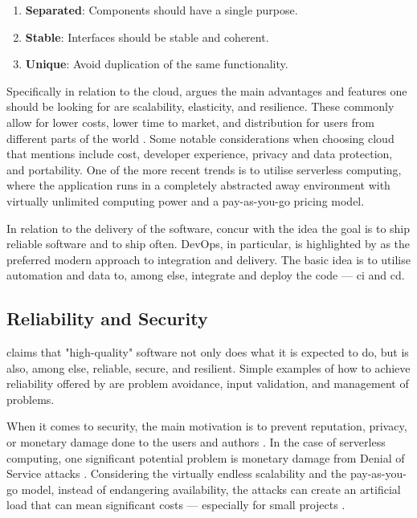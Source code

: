 \begin{enumerate}
    \item \textbf{Separated}: Components should have a single purpose.
    \item \textbf{Stable}: Interfaces should be stable and coherent.
    \item \textbf{Unique}: Avoid duplication of the same functionality.
\end{enumerate}

Specifically in relation to the cloud, \textcite[Chapter~5]{Sommerville_2019} argues the main advantages and features one should be looking for are scalability, elasticity, and resilience.
These commonly allow for lower costs, lower time to market, and distribution for users from different parts of the world \parencite[Chapter~5]{Sommerville_2019}.
Some notable considerations when choosing cloud that \textcite[Chapter~5]{Sommerville_2019} mentions include cost, developer experience, privacy and data protection, and portability.
One of the more recent trends is to utilise serverless computing, where the application runs in a completely abstracted away environment with virtually unlimited computing power and a pay-as-you-go pricing model.

In relation to the delivery of the software, \textcites[Chapter~10]{Sommerville_2019}[Chapter~7]{Fogel_2022} concur with the idea the goal is to ship reliable software and to ship often.
DevOps, in particular, is highlighted by \textcite[Chapter~10]{Sommerville_2019} as the preferred modern approach to integration and delivery.
The basic idea is to utilise automation and data to, among else, integrate and deploy the code --- \gls{ci} and \gls{cd}.

\subsection{Reliability and Security}

\textcite[Chapter~8]{Sommerville_2019} claims that "high-quality" software not only does what it is expected to do, but is also, among else, reliable, secure, and resilient.
Simple examples of how to achieve reliability offered by \textcite[Chapter~8]{Sommerville_2019} are problem avoidance, input validation, and management of problems.

When it comes to security, the main motivation is to prevent reputation, privacy, or monetary damage done to the users and authors \textcite[Chapter~7]{Sommerville_2019}.
In the case of serverless computing, one significant potential problem is monetary damage from Denial of Service attacks \parencite{Kelly2021}.
Considering the virtually endless scalability and the pay-as-you-go model, instead of endangering availability, the attacks can create an artificial load that can mean significant costs --- especially for small projects \parencite{Kelly2021}.

